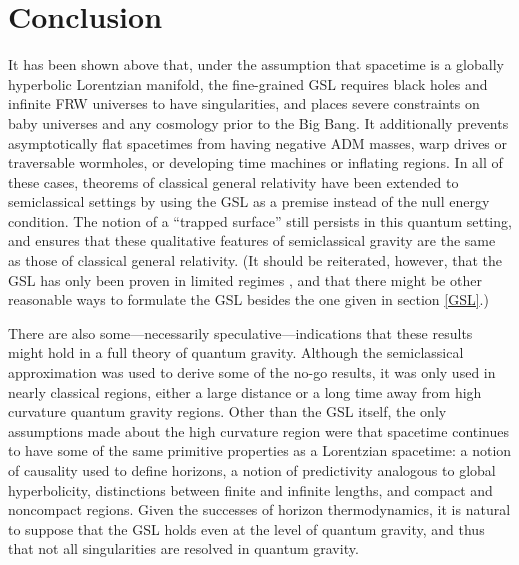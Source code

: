 \documentclass{article}
\begin{document}
\section{Conclusion}

It has been shown above that, under the assumption that spacetime is a globally hyperbolic Lorentzian manifold, the fine-grained GSL requires black holes and infinite FRW universes to have singularities, and places severe constraints on baby universes and any cosmology prior to the Big Bang.  It additionally prevents asymptotically flat spacetimes from having negative ADM masses, warp drives or traversable wormholes, or developing time machines or inflating regions.  In all of these cases, theorems of classical general relativity have been extended to semiclassical settings by using the GSL as a premise instead of the null energy condition.  The notion of a ``trapped surface'' still persists in this quantum setting, and ensures that these qualitative features of semiclassical gravity are the same as those of classical general relativity.  (It should be reiterated, however, that the GSL has only been proven in limited regimes \cite{10proofs}, and that there might be other reasonable ways to formulate the GSL besides the one given in section \ref{GSL}.)

There are also some---necessarily speculative---indications that these results might hold in a full theory of quantum gravity.  Although the semiclassical approximation was used to derive some of the no-go results, it was only used in nearly classical regions, either a large distance or a long time away from high curvature quantum gravity regions.  Other than the GSL itself, the only assumptions made about the high curvature region were that spacetime continues to have some of the same primitive properties as a Lorentzian spacetime: a notion of causality used to define horizons, a notion of predictivity analogous to global hyperbolicity, distinctions between finite and infinite lengths, and compact and noncompact regions.  Given the successes of horizon thermodynamics, it is natural to suppose that the GSL holds even at the level of quantum gravity, and thus that not all singularities are resolved in quantum gravity.
\end{document}

